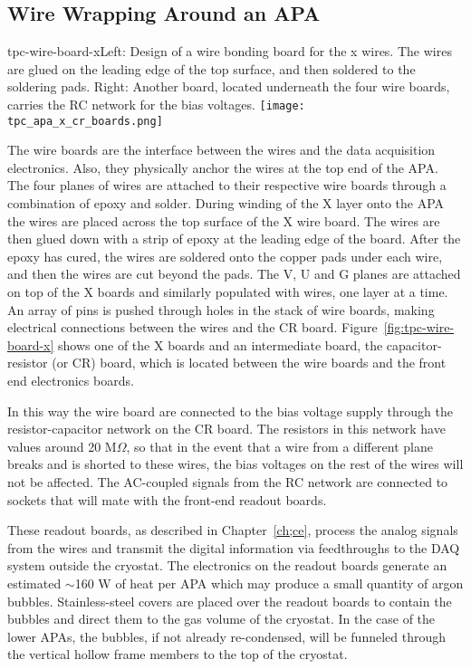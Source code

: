 \subsection{Wire Wrapping Around an APA}


\begin{cdrfigure}{tpc-wire-board-x}{Left: Design of a wire bonding board for the x wires.  The wires are glued on the leading edge of the top surface, and then soldered to the soldering pads. Right: Another board, located underneath the four wire boards, carries the RC network for the bias voltages.}
\texttt{[image: tpc\_apa\_x\_cr\_boards.png]}
\end{cdrfigure}

The wire boards are the interface between the wires and the data acquisition electronics.  Also, they physically anchor the wires at the top end of the APA.  The four planes of wires are attached to their respective wire boards through a combination of epoxy and solder. During winding of the X layer onto the APA the wires are placed across the top surface of the X wire board. The wires are then glued down with a strip of epoxy at the leading edge of the board.  After the epoxy has cured, the wires are soldered onto the copper pads under each wire, and then the wires are cut beyond the pads. The V, U and G planes are attached on top of the X boards and similarly populated with wires, one layer at a time. An array of pins is pushed through holes in the stack of wire boards, making electrical connections between the wires and the CR board.   
Figure~\ref{fig:tpc-wire-board-x} shows one of the X boards and an intermediate board, the capacitor-resistor (or CR) board, which is located between the wire boards and the front end electronics boards.  

In this way the wire board are connected to the bias voltage supply through the resistor-capacitor network on the CR board. The resistors in this network have values around 20 M$\Omega$, so that in the event that a wire from a different plane breaks and is shorted to these wires, the bias voltages on the rest of the wires will not be affected. The AC-coupled signals from the RC network are connected to sockets that will mate with the front-end readout boards.

These readout boards, as described in Chapter~\ref{ch;ce}, process the analog signals from the wires and transmit the digital information via feedthroughs to the DAQ system outside the cryostat. The electronics on the readout boards generate an estimated $\sim$160 W of heat per APA which may produce a small quantity of argon bubbles.  Stainless-steel covers are placed over the readout boards to contain the bubbles and direct them to the gas volume of the cryostat. In the case of the lower APAs, the bubbles, if not already re-condensed, will be funneled through the vertical hollow frame members to the top of the cryostat.


